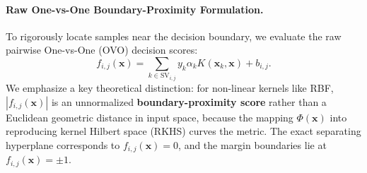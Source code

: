 \paragraph{Raw One-vs-One Boundary-Proximity Formulation.}
To rigorously locate samples near the decision boundary, we evaluate the raw pairwise One-vs-One (OVO) decision scores:
\begin{equation}
    f_{i,j}(\mathbf{x}) = \sum_{k \in \text{SV}_{i,j}} y_k \alpha_k K(\mathbf{x}_k, \mathbf{x}) + b_{i,j}.
\end{equation}
We emphasize a key theoretical distinction: for non-linear kernels like RBF, $|f_{i,j}(\mathbf{x})|$ is an unnormalized \textbf{boundary-proximity score} rather than a Euclidean geometric distance in input space, because the mapping $\Phi(\mathbf{x})$ into reproducing kernel Hilbert space (RKHS) curves the metric. The exact separating hyperplane corresponds to $f_{i,j}(\mathbf{x}) = 0$, and the margin boundaries lie at $f_{i,j}(\mathbf{x}) = \pm 1$.

\begin{table}[t]
\centering
\caption{Q4(b) Dual Support Vector Counts and Closest Test Sample Boundary-Proximity Scores for the Top-3 Difficult Class Pairs.}
\label{tab:q4b_geometry}
\end{table}

